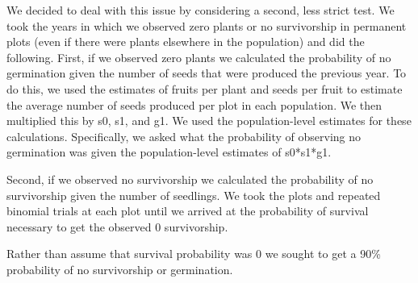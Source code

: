 \documentclass[12pt, oneside, titlepage]{article}   	%
\begin{document}
We decided to deal with this issue by considering a second, less strict test. We took the years in which we observed zero plants or no survivorship in permanent plots (even if there were plants elsewhere in the population) and did the following. First, if we observed zero plants we calculated the probability of no germination given the number of seeds that were produced the previous year. To do this, we used the estimates of fruits per plant and seeds per fruit to estimate the average number of seeds produced per plot in each population. We then multiplied this by s0, s1, and g1. We used the population-level estimates for these calculations. Specifically, we asked what the probability of observing no germination was given the population-level estimates of s0*s1*g1.

Second, if we observed no survivorship we calculated the probability of no survivorship given the number of seedlings. We took the plots and repeated binomial trials at each plot until we arrived at the probability of survival necessary to get the observed 0 survivorship. 

Rather than assume that survival probability was 0 we sought to get a 90\% probability of no survivorship or germination. 

\clearpage
\newpage

\fi


\clearpage
 

\end{document}
